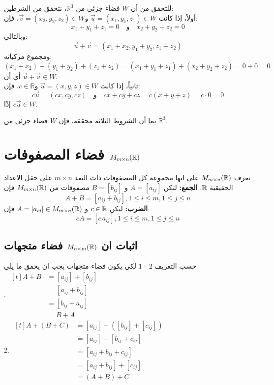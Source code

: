 \begin{solution}
	للتحقق من أن $W$ فضاء جزئي من $\mathbb{R}^3$، نتحقق من الشرطين:\\
	\noindent
	أولاً، إذا كانت $\vec{u} = (x_1, y_1, z_1) \in W$ و$\vec{v} = (x_2, y_2, z_2) \in W$، فإن:
	\[
	x_1 + y_1 + z_1 = 0 \quad \text{و} \quad x_2 + y_2 + z_2 = 0
	\]
	وبالتالي:
	\[
	\vec{u} + \vec{v} = (x_1 + x_2, y_1 + y_2, z_1 + z_2)
	\]
	ومجموع مركباته:
	\[
	(x_1 + x_2) + (y_1 + y_2) + (z_1 + z_2) = (x_1 + y_1 + z_1) + (x_2 + y_2 + z_2) = 0 + 0 = 0
	\]
	أي أن $\vec{u} + \vec{v} \in W$.\\
	\noindent
	ثانياً، إذا كانت $\vec{u} = (x, y, z) \in W$ و$c \in \mathbb{R}$، فإن:
	\[
	c\vec{u} = (cx, cy, cz) \quad \text{و} \quad cx + cy + cz = c(x + y + z) = c \cdot 0 = 0
	\]
	إذًا $c\vec{u} \in W$.
	
	بما أن الشروط الثلاثة محققة، فإن $W$ فضاء جزئي من $\mathbb{R}^3$.
\end{solution}


\section[فضاء المصفوفات $M_{m\times n}(\R)$]{فضاء المصفوفات $M_{m\times n}(\R)$ \cite{key2}}
تعرف $M_{m\times n}(\R)$ على انها مجموعة كل المصفوفات ذات البعد $m \times n$ على حقل الاعداد الحقيقية $\mathbb{R}$. 
\textbf{الجمع:} لتكن $A=[a_{ij}]$ و $B=[b_{ij}]$ مصفوفات من $M_{m\times n}(\R)$ فإن 
\[
A + B = [a_{ij} + b_{ij}] , 1\leq i\leq m, 1\leq j\leq n  
\]
\textbf{الضرب:} ليكن $c\in \mathbb{R}$ و $A = [a_{ij}]\in M_{m\times n}(\mathbb{R})$ فإن 
\[
cA = [c\, a_{ij}] , 1\leq i\leq m, 1\leq j\leq n
\]


\subsection*{اثبات ان $M_{n\times m}(\mathbb{R})$ فضاء متجهات}
حسب التعريف 2 - 1 لكي يكون فضاء متجهات يجب ان يحقق ما يلي\\

. $
\begin{aligned}[t]
	A + B &= [a_{ij}] + [b_{ij}]\\
	&= [a_{ij} + b_{ij}]\\
	&= [b_{ij} + a_{ij}]\\
	&= B+A
\end{aligned}
$\\
2. $
\begin{aligned}[t]
	A + (B+C) &= [a_{ij}] + ([b_{ij}] + [c_{ij}])\\
	&= [a_{ij}] + [b_{ij} + c_{ij}]\\
	&= [a_{ij} + b_{ij} + c_{ij}]\\
	&= [a_{ij} + b_{ij}] + [c_{ij}]\\
	&= (A+B)+C
\end{aligned}
$

